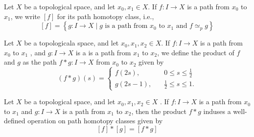 \documentclass{article}
\theoremstyle{remark}
\begin{document}
\begin{definition}
    Let $X$ be a topological space, and let $x_{0}, x_{1} \in X$. If $f: I \to X$  is a path from $x_{0}$  to $x_{1}$,
    we write $\left[ f \right]$ for its path homotopy class, i.e., \[
    \left[ f \right] = \left\{ g: I \to X  \mid g \text{ is a path from }x_{0} \text{ to } x_{1} \text{ and } f \simeq
    _{p} g \right\}
    \]
\end{definition}

\begin{definition}
    Let $X$ be a topologicala space, and let $x_{0}, x_{1}, x_{2} \in X$. If $f: I \to X$ is a path from $x_{0}$  to
    $x_{1}$ , and $g: I \to X$ is a is a path from $x_{1}$ to $x_{2}$, we define the product of $f$ and $g$  as the path
    $f * g: I \to X$ from $x_{0}$ to $x_{2}$ given by \[
    \left( f*g \right)\left( s \right) = \begin{cases}
        f\left( 2s \right) ,&  \quad 0\le s \le \frac{1}{2}\\
        g\left( 2s -1 \right),&  \quad  \frac{1}{2} \le s \le 1.
    \end{cases}
    \]
\end{definition}

\begin{lemma}
    Let $X$  be a topological space, and let $x_{0}, x_{1}, x_{2} \in  X$ . If $f: I \to X$ is a path from $x_{0}$ to
    $x_{1}$ and $g: I\to X$ is a path from $x_{1}$ to $x_{2}$, then the product $f * g$ induses a well-defined operation
    on path homotopy classes given by \[
    \left[ f \right] * \left[ g \right] = \left[ f * g \right]
    \]

\end{lemma}
\end{document}
